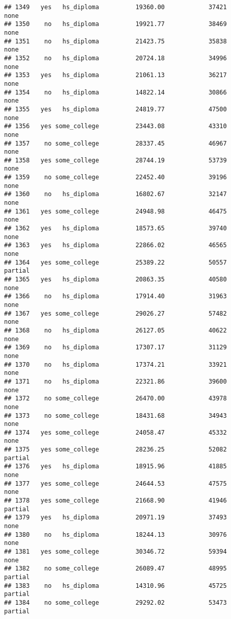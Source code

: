 \documentclass[
]{article}
\begin{document}
\begin{verbatim}
## 1349   yes   hs_diploma          19360.00            37421        none
## 1350    no   hs_diploma          19921.77            38469        none
## 1351    no   hs_diploma          21423.75            35838        none
## 1352    no   hs_diploma          20724.18            34996        none
## 1353   yes   hs_diploma          21061.13            36217        none
## 1354    no   hs_diploma          14822.14            30866        none
## 1355   yes   hs_diploma          24819.77            47500        none
## 1356   yes some_college          23443.08            43310        none
## 1357    no some_college          28337.45            46967        none
## 1358   yes some_college          28744.19            53739        none
## 1359    no some_college          22452.40            39196        none
## 1360    no   hs_diploma          16802.67            32147        none
## 1361   yes some_college          24948.98            46475        none
## 1362   yes   hs_diploma          18573.65            39740        none
## 1363   yes   hs_diploma          22866.02            46565        none
## 1364   yes some_college          25389.22            50557     partial
## 1365   yes   hs_diploma          20863.35            40580        none
## 1366    no   hs_diploma          17914.40            31963        none
## 1367   yes some_college          29026.27            57482        none
## 1368    no   hs_diploma          26127.05            40622        none
## 1369    no   hs_diploma          17307.17            31129        none
## 1370    no   hs_diploma          17374.21            33921        none
## 1371    no   hs_diploma          22321.86            39600        none
## 1372    no some_college          26470.00            43978        none
## 1373    no some_college          18431.68            34943        none
## 1374   yes some_college          24058.47            45332        none
## 1375   yes some_college          28236.25            52082     partial
## 1376   yes   hs_diploma          18915.96            41885        none
## 1377   yes some_college          24644.53            47575        none
## 1378   yes some_college          21668.90            41946     partial
## 1379   yes   hs_diploma          20971.19            37493        none
## 1380    no   hs_diploma          18244.13            30976        none
## 1381   yes some_college          30346.72            59394        none
## 1382    no some_college          26089.47            48995     partial
## 1383    no   hs_diploma          14310.96            45725     partial
## 1384    no some_college          29292.02            53473     partial

\end{verbatim}
\end{document}
